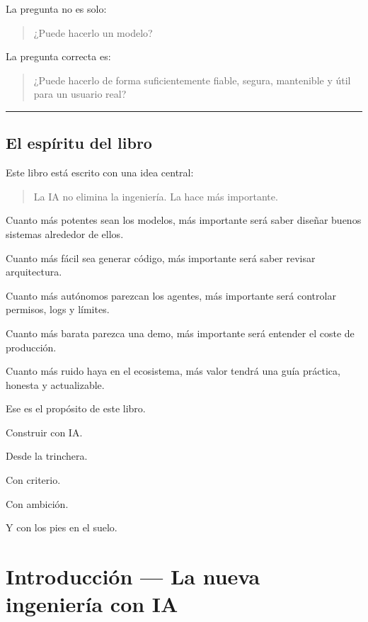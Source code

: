 La pregunta no es solo:

\begin{quote}
¿Puede hacerlo un modelo?
\end{quote}

La pregunta correcta es:

\begin{quote}
¿Puede hacerlo de forma suficientemente fiable, segura, mantenible y
útil para un usuario real?
\end{quote}

\begin{center}\rule{0.5\linewidth}{0.5pt}\end{center}

\section{El espíritu del libro}\label{el-espuxedritu-del-libro}

Este libro está escrito con una idea central:

\begin{quote}
La IA no elimina la ingeniería. La hace más importante.
\end{quote}

Cuanto más potentes sean los modelos, más importante será saber diseñar
buenos sistemas alrededor de ellos.

Cuanto más fácil sea generar código, más importante será saber revisar
arquitectura.

Cuanto más autónomos parezcan los agentes, más importante será controlar
permisos, logs y límites.

Cuanto más barata parezca una demo, más importante será entender el
coste de producción.

Cuanto más ruido haya en el ecosistema, más valor tendrá una guía
práctica, honesta y actualizable.

Ese es el propósito de este libro.

Construir con IA.

Desde la trinchera.

Con criterio.

Con ambición.

Y con los pies en el suelo.

\newpage

\chapter{Introducción --- La nueva ingeniería con
IA}\label{introducciuxf3n-la-nueva-ingenieruxeda-con-ia}

